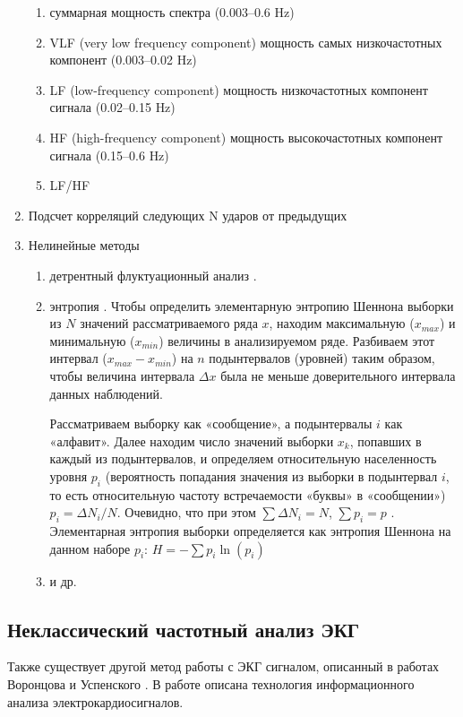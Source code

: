 \begin{enumerate}
	\begin{enumerate}
		\item суммарная мощность спектра (0.003–0.6 Hz)
		\item VLF (very low frequency component) мощность самых низкочастотных компонент (0.003–0.02 Hz)
		\item LF (low-frequency component) мощность низкочастотных компонент сигнала (0.02–0.15 Hz)
		\item HF (high-frequency component) мощность высокочастотных компонент сигнала (0.15–0.6 Hz)
		\item LF/HF
	\end{enumerate}
	
	\item Подсчет корреляций следующих N ударов от предыдущих \cite{autocorr_metric}
	\item Нелинейные методы \cite{non_linear_metric}
	
	\begin{enumerate}
		\item детрентный флуктуационный анализ \cite{fluct_analis}.
		
		\item энтропия \cite{entropy1}. Чтобы определить элементарную энтропию Шеннона выборки из $N$
		значений рассматриваемого ряда ${x}$, находим максимальную ($x_{max}$) и минимальную ($x_{min}$) величины в анализируемом ряде. Разбиваем этот интервал ($x_{max} - x_{min}$) на $n$ подынтервалов (уровней) таким образом, чтобы величина интервала $\Delta x$ была не меньше доверительного интервала данных наблюдений. 
		
		Рассматриваем выборку как «сообщение», а подынтервалы $i$ как «алфавит». Далее находим число значений выборки ${x_k}$, попавших в каждый из подынтервалов, и определяем относительную населенность уровня $p_i$ (вероятность попадания значения из выборки в подынтервал $i$, то есть относительную частоту встречаемости «буквы» в «сообщении») $p_i = \Delta N_i / N$. Очевидно, что при этом $\sum{\Delta N_i} = N$, $\sum{p_i} = p$ . Элементарная энтропия выборки определяется как энтропия Шеннона на данном наборе $p_i$: $H = - \sum{p_i\ln(p_i)}$ 
		\item и др. \cite{other_analis1, other_analis2, other_analis3}
	\end{enumerate}	
\end{enumerate}
\subsection{Неклассический частотный анализ ЭКГ}
Также существует другой метод работы с ЭКГ сигналом, описанный в работах Воронцова и Успенского \cite{voronzov}. В работе описана технология информационного анализа электрокардиосигналов. 

